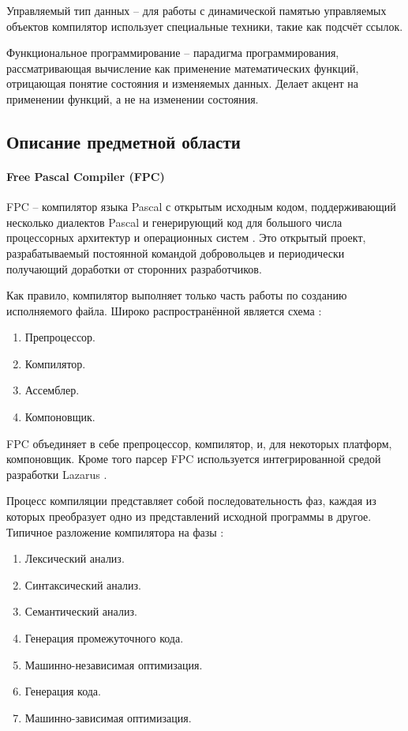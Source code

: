 \documentclass{imcs}
\begin{document}
Управляемый тип данных -- для работы с динамической памятью управляемых объектов
компилятор использует специальные техники, такие как подсчёт ссылок\cite{delhpimanged}.

Функциональное программирование -- парадигма программирования,
рассматривающая вычисление как применение математических функций,
отрицающая понятие состояния и изменяемых данных. Делает акцент на
применении функций, а не на изменении состояния.

\subsection{Описание предметной области}

\paragraph{Free Pascal Compiler (FPC)} FPC -- компилятор языка Pascal с открытым исходным
кодом, поддерживающий несколько диалектов Pascal и генерирующий код для большого
числа процессорных архитектур и операционных систем \cite{fpc}. Это открытый проект,
разрабатываемый постоянной командой добровольцев и периодически получающий доработки от
сторонних разработчиков.

Как правило, компилятор выполняет только часть работы по созданию исполняемого файла.
Широко распространённой является схема \cite{dragonbook}:
\begin{enumerate}
    \item Препроцессор.
    \item Компилятор.
    \item Ассемблер.
    \item Компоновщик.
\end{enumerate}

FPC объединяет в себе препроцессор, компилятор, и, для некоторых платформ,
компоновщик. Кроме того парсер FPC используется интегрированной средой разработки
Lazarus \cite{lazarus}.

Процесс компиляции представляет собой последовательность фаз, каждая из которых
преобразует одно из представлений исходной программы в другое. Типичное разложение
компилятора на фазы \cite{dragonbook}:
\begin{enumerate}
    \item Лексический анализ.
    \item Синтаксический анализ.
    \item Семантический анализ.
    \item Генерация промежуточного кода.
    \item Машинно-независимая оптимизация.
    \item Генерация кода.
    \item Машинно-зависимая оптимизация.
\end{enumerate}
\end{document}
